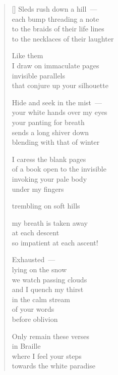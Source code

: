 \documentclass[12pt,a4paper]{article}
\begin{document}
\begin{verse}[\versewidth]
  Sleds rush down a hill~--- \\
  each bump threading a note \\
  to the braids of their life lines \\
  to the necklaces of their laughter

  Like them \\
  I draw on immaculate pages \\
  invisible parallels \\
  that conjure up your silhouette

  Hide and seek in the mist~--- \\
  your white hands over my eyes \\
  your panting for breath \\
  sends a long shiver down \\
  blending with that of winter

  I caress the blank pages \\
  of a book open to the invisible \\
  invoking your pale body \\
  under my fingers

  trembling on soft hills

  my breath is taken away \\
  at each descent \\
  so impatient at each ascent!

  Exhausted~--- \\
  lying on the snow \\
  we watch passing clouds \\
  and I quench my thirst \\
  in the calm stream \\
  of your words \\
  before oblivion

  Only remain these verses \\
  in Braille \\
  where I feel your steps \\
  towards the white paradise
\end{verse}


\newpage

\poemtitle{}

\settowidth{\versewidth}{like that afternoon}
\end{document}
